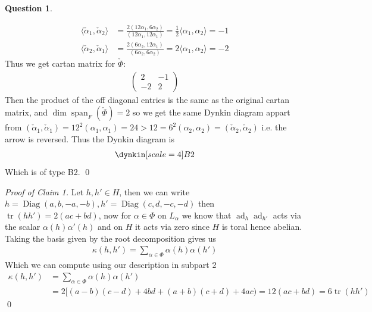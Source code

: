 \documentclass[10.5pt]{article}
\theoremstyle{definition}
\newtheorem{pb}{Question}
\numberwithin{example}{subsection}
\numberwithin{proposition}{subsection}
\newcommand{\gen}[1]{\langle#1\rangle}
\begin{document}
\begin{pb}
\begin{enumerate}
            \begin{align}
                \gen{\check{\alpha}_1,\check{\alpha}_2} &= \frac{2(12 \alpha_1,6 \alpha_2)}{(12\alpha_1,12\alpha_1)} = \frac{1}{2}\gen{\alpha_1,\alpha_2} = -1 \\
                \gen{\check{\alpha}_2,\check{\alpha}_1} &= \frac{2(6 \alpha_2,12 \alpha_1)}{(6\alpha_2,6\alpha_2)} = 2\gen{\alpha_1,\alpha_2} = -2
            \end{align}
            Thus we get cartan matrix for \(\check{\Phi}\):
            \begin{align}
                \begin{pmatrix} 2 & -1 \\ -2 & 2 \end{pmatrix} \label{cartandual}
            \end{align}
            Then the product of the off diagonal entries is the same as the original cartan matrix, and \(\dim \operatorname{span}_F(\check{\Phi}) = 2\) so we get the same Dynkin diagram appart from \((\check{\alpha}_1,\check{\alpha}_1) = 12^2(\alpha_1,\alpha_1) = 24 > 12 = 6^2(\alpha_2,\alpha_2) = (\check{\alpha}_2,\check{\alpha}_2)\) i.e. the arrow is reversed. Thus the Dynkin diagram is
            \begin{align}
                \dynkin[scale=4] B2 \label{B2}
            \end{align}
            Which is of type B2. \qed

            \emph{Proof of Claim 1.} Let \(h,h' \in H\), then we can write \(h = \operatorname{Diag}(a,b,-a,-b), h' = \operatorname{Diag}(c,d,-c,-d)\) then \(\operatorname{tr}(hh') = 2(ac + bd)\), now for \(\alpha \in \Phi\) on \(L_\alpha\) we know that \(\operatorname{ad}_h \operatorname{ad}_{h'}\) acts via the scalar \(\alpha(h) \alpha'(h)\) and on \(H\) it acts via zero since \(H\) is toral hence abelian. Taking the basis given by the root decomposition gives us
            \begin{align}
                \kappa(h,h') = \sum_{\alpha \in \Phi} \alpha(h) \alpha(h')
            \end{align}
            Which we can compute using our description in subpart 2
            \begin{align}
                \kappa(h,h') &= \sum_{\alpha \in \Phi} \alpha(h) \alpha(h') \\ 
                &= 2[(a-b)(c-d) + 4bd + (a + b)(c+d) + 4ac) = 12(ac + bd) = 6 \operatorname{tr}(hh')
            \end{align}
            \qed


\end{enumerate}
\end{pb}
\end{document}
